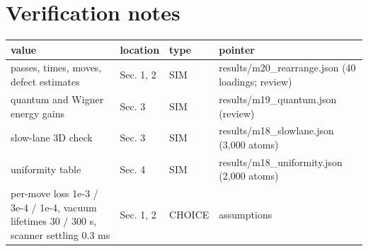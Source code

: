 \hypertarget{verification-notes}{%
\section{Verification notes}\label{rearrangement-verification-notes}}

{\footnotesize
\begin{longtable}[]{@{}>{\raggedright\arraybackslash}p{0.341\dimexpr(\linewidth-8\tabcolsep)\relax}>{\raggedright\arraybackslash}p{0.125\dimexpr(\linewidth-8\tabcolsep)\relax}>{\raggedright\arraybackslash}p{0.091\dimexpr(\linewidth-8\tabcolsep)\relax}>{\raggedright\arraybackslash}p{0.443\dimexpr(\linewidth-8\tabcolsep)\relax}@{}}
\toprule\noalign{}
value & location & type & pointer \\
\midrule\noalign{}
\endhead
\bottomrule\noalign{}
\endlastfoot
passes, times, moves, defect estimates & Sec. 1, 2 & SIM &
results/m20\_rearrange.json (40 loadings; review) \\
quantum and Wigner energy gains & Sec. 3 & SIM &
results/m19\_quantum.json (review) \\
slow-lane 3D check & Sec. 3 & SIM & results/m18\_slowlane.json (3,000
atoms) \\
uniformity table & Sec. 4 & SIM & results/m18\_uniformity.json (2,000
atoms) \\
per-move loss 1e-3 / 3e-4 / 1e-4, vacuum lifetimes 30 / 300 s, scanner
settling 0.3 ms & Sec. 1, 2 & CHOICE & assumptions \\
\end{longtable}
}
